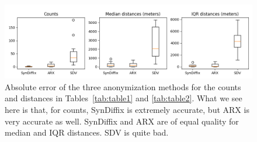 
        \begin{figure}
        \begin{center}
        \includegraphics[width=0.85\linewidth]{abs_err_tab1_tab2}
        \caption{Absolute error of the three anonymization methods for the counts and distances in Tables~\ref{tab:table1} and \ref{tab:table2}. What we see here is that, for counts, SynDiffix is extremely accurate, but ARX is very accurate as well. SynDiffix and ARX are of equal quality for median and IQR distances. SDV is quite bad.
        }
        \label{fig:abs_err_tab1_tab2}
        \end{center}
        \end{figure}
    
